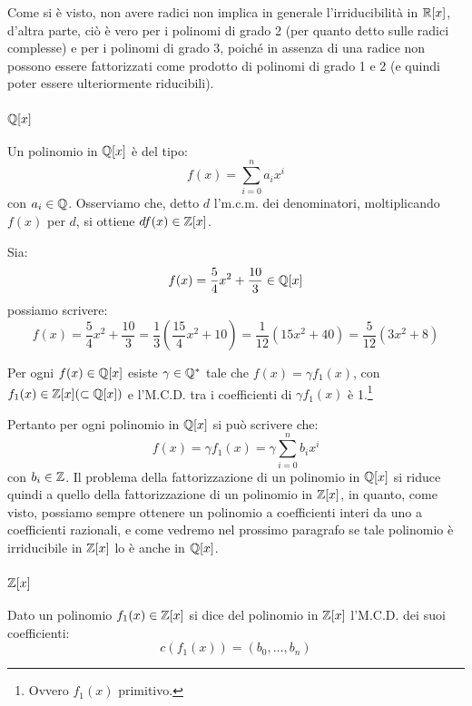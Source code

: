 \documentclass[11pt]{scrartcl}
\begin{document}
\begin{remark}
Come si è visto, non avere radici non implica in generale l'irriducibilità in $\mathbb R[x]$, d'altra parte, ciò è vero per i polinomi di grado 2 (per quanto detto sulle radici complesse) e per i polinomi di grado 3, poiché in assenza di una radice non possono essere fattorizzati come prodotto di polinomi di grado 1 e 2 (e quindi poter essere ulteriormente riducibili).
\end{remark}


\subsubsection{$\mathbb Q[x]$}
Un polinomio in $\mathbb Q[x]$ è del tipo:
	\[ f(x) = \sum_{i=0}^{n}a_ix^i
	\]
con $a_i \in \mathbb Q$. Osserviamo che, detto $d$ l'm.c.m. dei denominatori, moltiplicando $f(x)$ per $d$, si ottiene $df(x) \in \mathbb Z[x]$.

\begin{example}
Sia:
	\[ f(x) = \frac 54x^2 + \frac{10}{3} \in \mathbb Q[x]
	\]
possiamo scrivere:
	\[  f(x) = \frac 54x^2 + \frac{10}{3} = \frac 13\left(\frac{15}{4}x^2 + 10\right) = \frac{1}{12}\left(15x^2 + 40\right) = \frac{5}{12}\left(3x^2 + 8\right) 
	\]
\end{example}

\begin{proposition}
Per ogni $f(x) \in \mathbb Q[x]$ esiste $\gamma \in \mathbb Q^*$ tale che $f(x) = \gamma f_1(x)$, con $f_1(x) \in \mathbb Z[x] (\subset \mathbb Q[x])$ e l'M.C.D. tra i coefficienti di $\gamma f_1(x) $ è 1.\footnote{Ovvero $f_1(x)$ primitivo.}
\end{proposition}

Pertanto per ogni polinomio in $\mathbb Q[x]$ si può scrivere che:
	\[ f(x) = \gamma f_1(x) = \gamma\sum_{i=0}^{n} b_ix^i
	\]
con $b_i \in \mathbb Z$. Il problema della fattorizzazione di un polinomio in $\mathbb Q[x]$ si riduce quindi a quello della fattorizzazione di un polinomio in $\mathbb Z[x]$, in quanto, come visto, possiamo sempre ottenere un polinomio a coefficienti interi da uno a coefficienti razionali, e come vedremo nel prossimo paragrafo se tale polinomio è irriducibile in $\mathbb Z[x]$ lo è anche in $\mathbb Q[x]$.

\subsubsection{$\mathbb Z[x]$}

\begin{definition}
Dato un polinomio $f_1(x) \in \mathbb Z[x]$ si dice  del polinomio in $\mathbb Z[x]$ l'M.C.D. dei suoi coefficienti:
	\[ c(f_1(x)) = (b_0, \ldots, b_n)
	\]
\end{definition}
\end{document}
